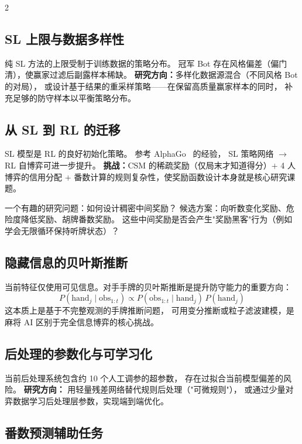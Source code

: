 \documentclass{article}
\begin{document}
\begin{multicols}{2}
\subsection{SL 上限与数据多样性}

纯 SL 方法的上限受制于训练数据的策略分布。
冠军 Bot 存在风格偏差（偏门清），使赢家过滤后副露样本稀缺。
\textbf{研究方向：}多样化数据源混合（不同风格 Bot 的对局），
或设计基于结果的重采样策略——在保留高质量赢家样本的同时，
补充足够的防守样本以平衡策略分布。

\subsection{从 SL 到 RL 的迁移}

SL 模型是 RL 的良好初始化策略。
参考 AlphaGo~\cite{silver2016mastering} 的经验，
SL 策略网络 $\to$ RL 自博弈可进一步提升。
\textbf{挑战：}CSM 的稀疏奖励（仅局末才知道得分）$+$ 4 人博弈的信用分配
$+$ 番数计算的规则复杂性，使奖励函数设计本身就是核心研究课题。

一个有趣的研究问题：如何设计稠密中间奖励？
候选方案：向听数变化奖励、危险度降低奖励、胡牌番数奖励。
这些中间奖励是否会产生"奖励黑客"行为（例如学会无限循环保持听牌状态）？

\subsection{隐藏信息的贝叶斯推断}

当前特征仅使用可见信息。对手手牌的贝叶斯推断是提升防守能力的重要方向：
\begin{equation}
P(\text{hand}_j \mid \text{obs}_{1:t})
\propto P(\text{obs}_{1:t} \mid \text{hand}_j)\, P(\text{hand}_j)
\end{equation}
这本质上是基于不完整观测的手牌推断问题，
可用变分推断或粒子滤波建模，是麻将 AI 区别于完全信息博弈的核心挑战。

\subsection{后处理的参数化与可学习化}

当前后处理系统包含约 10 个人工调参的超参数，
存在过拟合当前模型偏差的风险。
\textbf{研究方向：}
用轻量残差网络替代规则后处理（"可微规则"），
或通过少量对弈数据学习后处理层参数，实现端到端优化。

\subsection{番数预测辅助任务}


\end{multicols}
\end{document}
